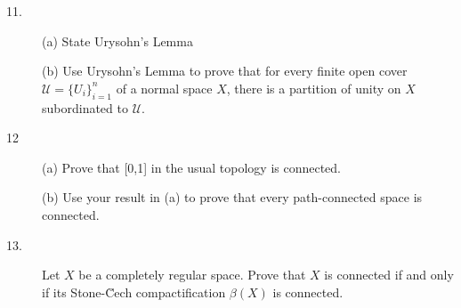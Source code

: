 \documentclass{article}
\begin{document}
\begin{description}
\item[11.] (a)
State Urysohn's Lemma

\item[\quad] (b)
Use Urysohn's Lemma to prove that for every finite open cover
${\mathcal U} = \{U_i\}^n_{i=1}$ of a normal space $X$, there is a partition
of unity on $X$ subordinated to $\mathcal U$.

\item[12] (a)
Prove that [0,1] in the usual topology is connected.

\item[\quad] (b)
Use your result in (a) to prove that every path-connected space is connected.

\item[13.]
Let $X$ be a completely regular space. Prove that $X$ is connected if and only
if its Stone-\u Cech compactification $\beta (X)$ is connected.





\end{description}    
\end{document}
